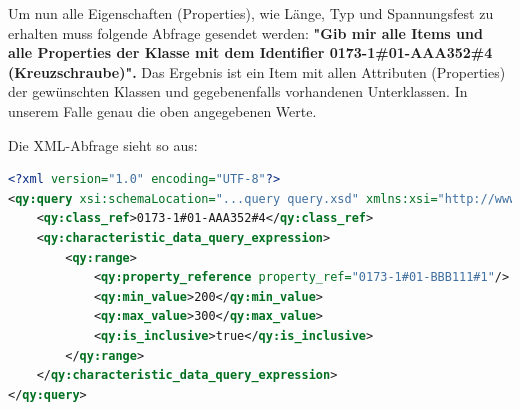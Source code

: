 Um nun alle Eigenschaften (Properties), wie Länge, Typ und Spannungsfest zu erhalten muss folgende Abfrage gesendet werden: 
\textbf{"Gib mir alle Items und alle Properties der Klasse mit dem Identifier 0173-1\#01-AAA352\#4 (Kreuzschraube)".}
Das Ergebnis ist ein Item mit allen Attributen (Properties) der gewünschten Klassen und gegebenenfalls vorhandenen Unterklassen. In unserem Falle genau die oben angegebenen Werte.

Die XML-Abfrage sieht so aus:

\begin{lstlisting}[caption=Query Beispiel - Daten abfragen, language=XML, label=UseCaseDatenabfragen]
<?xml version="1.0" encoding="UTF-8"?>
<qy:query xsi:schemaLocation="...query query.xsd" xmlns:xsi="http://www.w3.org/2001/XMLSchema-instance" xmlns:cat="...catalogue" xmlns:val="...value" xmlns:qy="...query" xmlns:bas="...basic">
	<qy:class_ref>0173-1#01-AAA352#4</qy:class_ref>
	<qy:characteristic_data_query_expression>
		<qy:range>
			<qy:property_reference property_ref="0173-1#01-BBB111#1"/>
			<qy:min_value>200</qy:min_value>
			<qy:max_value>300</qy:max_value>
			<qy:is_inclusive>true</qy:is_inclusive>
		</qy:range>
	</qy:characteristic_data_query_expression>
</qy:query>
\end{lstlisting}



